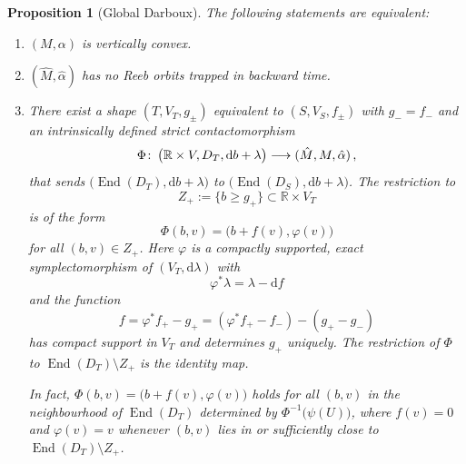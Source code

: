 \documentclass[10pt,a4paper]{amsart}
\newtheorem{prop}{Proposition}
\DeclareMathOperator{\End}{\mathrm{End}}
\newcommand{\R}{\mathbb R}
\def\co{\colon\thinspace}
\newcommand{\lra}{\longrightarrow}
\newcommand{\rmd}{\mathrm d}
\begin{document}
\begin{prop}[Global Darboux]
 \label{prop:globalflowbox}
 The following statements are equivalent:
	\begin{enumerate}
	  \item[(a)]
	  $(M,\alpha)$ is vertically convex.
	  \item[(b)]
	  $(\hat{M},\hat{\alpha})$ has no Reeb orbits
	  trapped in backward time.
	  \item[(c)]
	  There exist a shape $(T,V_T,g_{\pm})$
	  equivalent to $(S,V_S,f_{\pm})$ with $g_-=f_-$
	  and an intrinsically defined strict contactomorphism
	  \[
	    \Phi\co
	    \big(\R\times V,D_T,\rmd b+\lambda\big)
	    \lra
	    (\hat{M},M,\hat{\alpha})
	    \,,
	  \]
	  that sends $\big(\!\End(D_T),\rmd b+\lambda\big)$
	  to $\big(\!\End(D_S),\rmd b+\lambda\big)$.
	  The restriction to
	  \[
	    Z_+:=\{b\geq g_+\}\subset\R\times V_T
	  \]
	  is of the form
	  \[
	    \Phi(b,v)=\big(b+f(v),\varphi(v)\big)
	  \]
	  for all $(b,v)\in Z_+$.
	  Here $\varphi$ is a compactly supported,
	  exact symplectomorphism of $(V_T,\rmd\lambda)$
	  with
	  \[
	  \varphi^*\lambda=\lambda-\rmd f
	  \]
	  and the function
	  \[
	  f=\varphi^*f_+-g_+
	  =(\varphi^*f_+-f_-)-(g_+-g_-)
	  \]
	  has compact support in $V_T$ and determines $g_+$
	  uniquely.
	  The restriction of $\Phi$ to $\End(D_T)\setminus Z_+$
	  is the identity map.
	  
	  In fact,
	  $\Phi(b,v)=\big(b+f(v),\varphi(v)\big)$
	  holds for all $(b,v)$ in the neighbourhood of $\End(D_T)$
	  determined by $\Phi^{-1}\big(\psi(U)\big)$,
	  where $f(v)=0$ and $\varphi(v)=v$
	  whenever $(b,v)$ lies
	  in or sufficiently close to $\End(D_T)\setminus Z_+$.
	\end{enumerate}
\end{prop}
\end{document}
